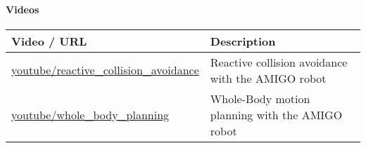 \paragraph{Videos}
\begin{longtable}{|p{6cm}p{9cm}|}
\hline
\rowcolor[gray]{0.8} \bf Video / URL & \bf Description\\
\hline
\href{https://www.youtube.com/watch?v=Fc9SOGC_sMA}{youtube/reactive\_collision\_avoidance} & Reactive collision avoidance with the AMIGO robot \\
\href{https://www.youtube.com/watch?v=Fc9SOGC_sMA}{youtube/whole\_body\_planning} & Whole-Body motion planning with the AMIGO robot\\
\hline
\end{longtable}

